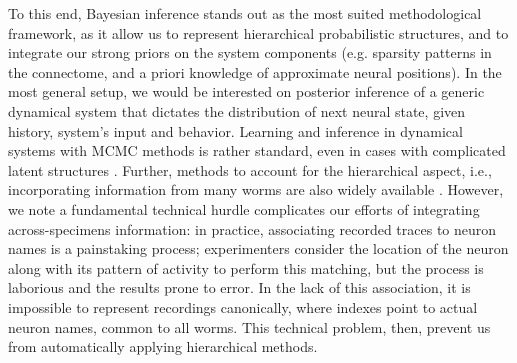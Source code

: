\documentclass{article}
\begin{document}
  To this end, Bayesian inference  stands out as the most suited methodological framework, as it allow us to represent hierarchical probabilistic structures, and to integrate our strong priors on the system components (e.g. sparsity patterns in the connectome, and a priori knowledge of approximate neural positions).
In the most general setup, we would be interested on posterior inference of a generic dynamical system that dictates the distribution of next neural state, given history, system's input and behavior. Learning and inference in dynamical systems with MCMC methods is rather standard, even in cases with complicated latent structures \cite{Freitas2001,Paninski2010}. Further, methods to account for the hierarchical aspect, i.e., incorporating information from many worms are also widely available \citep{Gelman2014}. However, we note a fundamental
technical hurdle complicates our efforts of integrating across-specimens information: in practice, associating recorded traces to neuron names is a painstaking process; experimenters
consider the location of the neuron along with its pattern of activity to perform this matching, but the process is laborious and the results prone to error. 
In the lack of this association, it is impossible to represent recordings canonically, where indexes point to actual neuron names, common to all worms. This technical problem, then, prevent us from automatically applying hierarchical methods.
\end{document}
